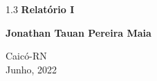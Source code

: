 \begin{titlepage}
\begin{center}
		{\setlength{\baselineskip}%
		{1.3\baselineskip}
		{\LARGE \textbf{Relatório I}}\par}
			
		\vspace{3cm}
			
		{\large \textbf{Jonathan Tauan Pereira Maia}}
						
		\vspace{6cm}
		
		Caicó-RN\\Junho, 2022
	\end{center}
\end{titlepage}